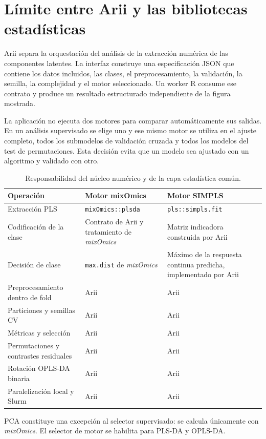 \documentclass[11pt,a4paper,openany]{report}
\newcommand{\mixOmics}{\textit{mixOmics}}
\newcommand{\code}[1]{\texttt{#1}}
\begin{document}
\section{Límite entre Arii y las bibliotecas estadísticas}

Arii separa la orquestación del análisis de la extracción numérica de las componentes latentes. La interfaz construye una especificación JSON que contiene los datos incluidos, las clases, el preprocesamiento, la validación, la semilla, la complejidad y el motor seleccionado. Un worker R consume ese contrato y produce un resultado estructurado independiente de la figura mostrada.

La aplicación no ejecuta dos motores para comparar automáticamente sus salidas. En un análisis supervisado se elige uno y ese mismo motor se utiliza en el ajuste completo, todos los submodelos de validación cruzada y todos los modelos del test de permutaciones. Esta decisión evita que un modelo sea ajustado con un algoritmo y validado con otro.

\begin{table}[H]
\centering
\small
\begin{tabularx}{\textwidth}{@{}p{}XX@{}}
\toprule
\textbf{Operación} & \textbf{Motor mixOmics} & \textbf{Motor SIMPLS} \\
\midrule
Extracción PLS & \code{mixOmics::plsda} & \code{pls::simpls.fit} \\
Codificación de la clase & Contrato de Arii y tratamiento de \mixOmics & Matriz indicadora construida por Arii \\
Decisión de clase & \code{max.dist} de \mixOmics & Máximo de la respuesta continua predicha, implementado por Arii \\
Preprocesamiento dentro de fold & Arii & Arii \\
Particiones y semillas CV & Arii & Arii \\
Métricas y selección & Arii & Arii \\
Permutaciones y contrastes residuales & Arii & Arii \\
Rotación OPLS-DA binaria & Arii & Arii \\
Paralelización local y Slurm & Arii & Arii \\
\bottomrule
\end{tabularx}
\caption{Responsabilidad del núcleo numérico y de la capa estadística común.}
\end{table}

PCA constituye una excepción al selector supervisado: se calcula únicamente con \mixOmics. El selector de motor se habilita para PLS-DA y OPLS-DA.
\end{document}
